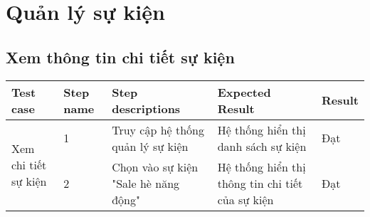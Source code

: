 \newpage

\section{Quản lý sự kiện}

\subsection{Xem thông tin chi tiết sự kiện}
{
    \setlength\extrarowheight{6pt}
    \begin{longtable}{| p{2.5cm}| p{1cm}| p{5.5cm}| p{4.5cm} | p{1.5cm} |}
        \hline
        \textbf{Test case} & \textbf{Step name} & \textbf{Step descriptions} & \textbf{Expected Result} & \textbf{Result} \\
        \hline
        \multirow[c]{2}{2.5cm}{Xem chi tiết sự kiện} & 1 & Truy cập hệ thống quản lý sự kiện & Hệ thống hiển thị danh sách sự kiện & Đạt \\
        \cline{2-5}
         & 2 & Chọn vào sự kiện "Sale hè năng động" & Hệ thống hiển thị thông tin chi tiết của sự kiện & Đạt \\
         \hline
    \end{longtable}
}

\newpage

